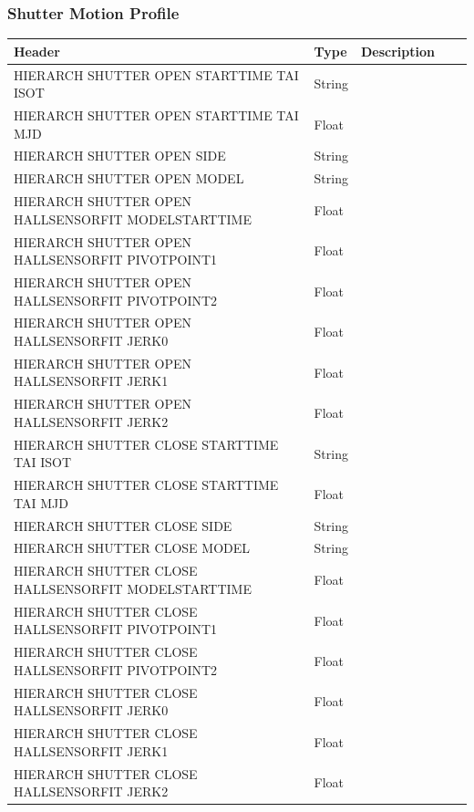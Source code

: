 \subsubsection{Shutter Motion Profile}
\begin{tabular}{l l l l l}

\hline
Header & Type & Description \\
\hline
HIERARCH SHUTTER OPEN STARTTIME TAI ISOT & String &  \\
HIERARCH SHUTTER OPEN STARTTIME TAI MJD & Float &  \\
HIERARCH SHUTTER OPEN SIDE & String &  \\
HIERARCH SHUTTER OPEN MODEL & String &  \\
HIERARCH SHUTTER OPEN HALLSENSORFIT MODELSTARTTIME & Float &  \\
HIERARCH SHUTTER OPEN HALLSENSORFIT PIVOTPOINT1 & Float &  \\
HIERARCH SHUTTER OPEN HALLSENSORFIT PIVOTPOINT2 & Float &  \\
HIERARCH SHUTTER OPEN HALLSENSORFIT JERK0 & Float &  \\
HIERARCH SHUTTER OPEN HALLSENSORFIT JERK1 & Float &  \\
HIERARCH SHUTTER OPEN HALLSENSORFIT JERK2 & Float &  \\
HIERARCH SHUTTER CLOSE STARTTIME TAI ISOT & String &  \\
HIERARCH SHUTTER CLOSE STARTTIME TAI MJD & Float &  \\
HIERARCH SHUTTER CLOSE SIDE & String &  \\
HIERARCH SHUTTER CLOSE MODEL & String &  \\
HIERARCH SHUTTER CLOSE HALLSENSORFIT MODELSTARTTIME & Float &  \\
HIERARCH SHUTTER CLOSE HALLSENSORFIT PIVOTPOINT1 & Float &  \\
HIERARCH SHUTTER CLOSE HALLSENSORFIT PIVOTPOINT2 & Float &  \\
HIERARCH SHUTTER CLOSE HALLSENSORFIT JERK0 & Float &  \\
HIERARCH SHUTTER CLOSE HALLSENSORFIT JERK1 & Float &  \\
HIERARCH SHUTTER CLOSE HALLSENSORFIT JERK2 & Float &  \\
\hline
\end{tabular}


